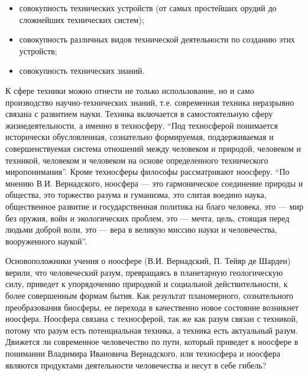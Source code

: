 \begin{itemize}
\item{совокупность технических устройств (от самых простейших орудий до сложнейших технических систем);}
\item{совокупность различных видов технической деятельности по созданию этих устройств;}
\item{совокупность технических знаний.}
\end{itemize}

К сфере техники можно отнести не только использование, но и само производство научно-технических знаний, т.е. современная техника неразрывно связана с развитием науки. Техника включается в самостоятельную сферу жизнедеятельности, а именно в техносферу. ``Под техносферой понимается исторически обусловленная, сознательно формируемая, поддерживаемая и совершенствуемая система отношений между человеком и природой, человеком и техникой, человеком и человеком на основе определенного технического миропонимания''. Кроме техносферы философы рассматривают ноосферу. ``По мнению В.И. Вернадского, ноосфера — это гармоническое соединение природы и общества, это торжество разума и гуманизма, это слитая воедино наука, общественное развитие и государственная политика на благо человека, это — мир без оружия, войн и экологических проблем, это — мечта, цель, стоящая перед людьми доброй воли, это — вера в великую миссию науки и человечества, вооруженного наукой''.

Основоположники учения о ноосфере (В.И. Вернадский, П. Тейяр де Шарден) верили, что человеческий разум, превращаясь в планетарную геологическую силу, приведет к упорядочению природной и социальной действительности, к более совершенным формам бытия. Как результат планомерного, сознательного преобразования биосферы, ее перехода в качественно новое состояние возникнет ноосфера. Ноосфера связана с техносферой, так же как разум связан с техникой, потому что разум есть потенциальная техника, а техника есть актуальный разум. Движется ли современное человечество по пути, который приведет к ноосфере в понимании Владимира Ивановича Вернадского, или техносфера и ноосфера являются продуктами деятельности человечества и несут в себе гибель?

